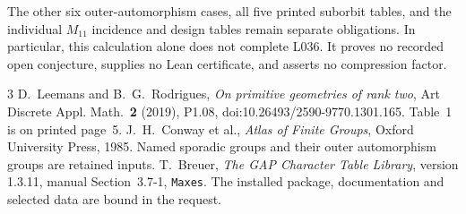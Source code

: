 \documentclass[11pt]{article}
\begin{document}
The other six outer-automorphism cases, all five printed suborbit
tables, and the individual $M_{11}$ incidence and design tables remain
separate obligations. In particular, this calculation alone does not
complete L036. It proves no recorded open conjecture, supplies no Lean
certificate, and asserts no compression factor.

\begin{thebibliography}{3}
 D.~Leemans and B.~G.~Rodrigues, \emph{On primitive geometries
of rank two}, Art Discrete Appl. Math.\ \textbf{2} (2019), P1.08,
doi:10.26493/2590-9770.1301.165. Table~1 is on printed page~5.
 J.~H.~Conway et al., \emph{Atlas of Finite Groups},
Oxford University Press, 1985. Named sporadic groups and their outer
automorphism groups are retained inputs.
 T.~Breuer, \emph{The GAP Character Table Library},
version 1.3.11, manual Section~3.7-1, \texttt{Maxes}. The installed
package, documentation and selected data are bound in the request.
\end{thebibliography}
\end{document}
